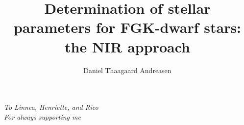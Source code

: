 \documentclass[fleqn]{fcup-thesis}
\author{Daniel Thaagaard Andreasen}
\title{Determination of stellar parameters for FGK-dwarf stars: the NIR approach}
\begin{document}
\begin{preliminary}

\maketitle

\cleardoublepage


\begin{dedication}
\centering \huge \itshape
To Linnea, Henriette, and Rico\\For always supporting me
\end{dedication}

\begin{acknowledgements}
\lipsum[1-2]
\end{acknowledgements}



\begin{abstract}
\lipsum[2]
\end{abstract}

\begin{abstract-pt}
\lipsum[2]
\end{abstract-pt}





\tableofcontents

\listoftables


\end{preliminary}
\end{document}
